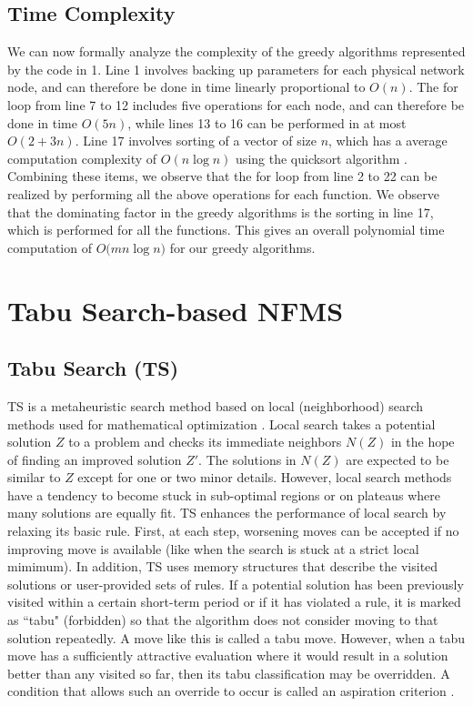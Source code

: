 \documentclass[conference]{IEEEtran}
\begin{document}
\subsection{Time Complexity}\label{tc1}
We can now formally analyze the complexity of the greedy algorithms represented by the code in 1. Line 1 involves backing up parameters for each physical network node, and can therefore be done in time linearly proportional to $O(n)$. The for loop from line 7 to 12 includes five operations for each node, and can therefore be done in time $O(5n)$, while lines 13 to 16 can be performed in at most $O(2 + 3n)$. Line 17 involves sorting of a vector of size $n$, which has a average computation complexity of $O(n \log n)$ using the quicksort algorithm \cite{Alsuwaiyel98}. Combining these items, we observe that the for loop from line 2 to 22 can be realized by performing all the above operations for each function. We observe that the dominating factor in the greedy algorithms is the sorting in line 17, which is performed for all the functions. This gives an overall polynomial time computation of $O\big(mn\log n\big)$ for our greedy algorithms.


\section{Tabu Search-based NFMS}\label{tabu}
\subsection{Tabu Search (TS)}
TS is a metaheuristic search method based on local (neighborhood) search methods used for mathematical optimization \cite{Glover1986533}. Local search \cite{MichielsLS} takes a potential solution $Z$ to a problem and checks its immediate neighbors $N(Z)$ in the hope of finding an improved solution $Z'$. The solutions in $N(Z)$ are expected to be similar to $Z$ except for one or two minor details. However, local search methods have a tendency to become stuck in sub-optimal regions or on plateaus where many solutions are equally fit. TS enhances the performance of local search by relaxing its basic rule. First, at each step, worsening moves can be accepted if no improving move is available (like when the search is stuck at a strict local mimimum). In addition, TS uses memory structures that describe the visited solutions or user-provided sets of rules. If a potential solution has been previously visited within a certain short-term period or if it has violated a rule, it is marked as ``tabu" (forbidden) so that the algorithm does not consider moving to that solution repeatedly. A move like this is called a tabu move. However, when a tabu move has a sufficiently attractive evaluation where it would result in a solution better than any visited so far, then its tabu classification may be overridden. A condition that allows such an override to occur is called an aspiration criterion \cite{GloverTS}.
\end{document}
